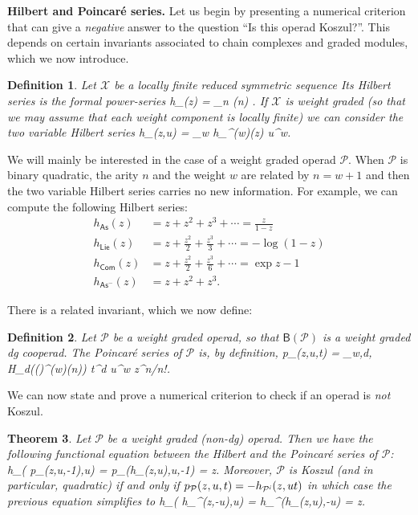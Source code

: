 \documentclass[fleqn, a4paper, twoside]{article}
\makeatletter
\newcommand{\eantishriek}{\emph{\text{\raisebox{\depth}{\textexclamdown}}}}
\newcommand{\0}{\langle 0\rangle}
\newcommand{\XX}{\mathcal{X}}
\newcommand{\B}[1]{\mathsf{B}(#1)}
\let\[\@undefined
\DeclareRobustCommand{\[}{\begin{equation}}%
\let\]\@undefined
\DeclareRobustCommand{\]}{\end{equation}}%
\theoremstyle{mytheorem}
\newtheorem{theorem}{Theorem}[section]
\theoremstyle{introthm}
\theoremstyle{mydefinition}
\newtheorem{definition}[theorem]{Definition}
\theoremstyle{mydefinition2}
\theoremstyle{plain} %
\newcommand{\As}{\mathsf{As}}
\newcommand{\Com}{\mathsf{Com}}
\newcommand{\Lie}{\mathsf{Lie}}
\newcommand{\?}{\,?\,}
\newcommand{\PP}{{\mathcal{P}}}
\theoremstyle{mytheorem}
\theoremstyle{plain} %
\makeatother
\begin{document}
\textbf{Hilbert and Poincar\'e series.} Let us begin
by presenting a numerical criterion that can give a \emph{negative}
answer to the question ``Is this operad Koszul?''. This
depends on certain invariants associated to chain complexes
and graded modules, which we now introduce.

\begin{definition}
Let $\XX$ be a locally finite reduced symmetric sequence
Its \emph{Hilbert series} is the formal power-series
\[
h_\XX(z) = \sum_{n} \dim \XX(n) .
\]
If $\XX$ is weight graded (so that we may assume that each
weight component is locally finite) we can consider the two
variable Hilbert series
 \[
h_\XX(z,u) = \sum_{w} h_{\XX^{(w)}}(z) u^w.
\]
\end{definition}

We will mainly be interested in the case of a weight graded operad $\PP$.
When $\PP$ is binary quadratic, the arity $n$ and the weight $w$ are related
by $n = w+1$ and then the two variable Hilbert series carries no new information.
For example, we can compute the following Hilbert series:
\begin{align*}
h_{\As}(z) &=  z + z^2 + z^3 + \cdots = \frac{z}{1-z} \\
h_{\Lie}(z) &=  z + \frac {z^2}2 + \frac{z^3} 3 + \cdots =-\log(1-z) \\
h_{\Com}(z) &=  z + \frac {z^2}2 + \frac{z^3} 6  + \cdots = \exp z -1 \\
h_{\As^-}(z) &=  z +  {z^2} + z^3.
\end{align*}


There is a related invariant, which we now define:
\begin{definition} Let $\PP$ be a weight graded operad, so that
$\B{\PP}$ is a weight graded dg cooperad. The Poincar\'e series
of $\PP$ is, by definition,
\[
p_{\PP}(z,u,t) = \sum_{w,d,} \dim H_d(\B{\PP}^{(w)}(n)) t^d u^w z^n/n!.
\]
\end{definition}

We can now state and prove a numerical criterion to check if an
operad is \emph{not} Koszul.

\begin{theorem}
Let $\PP$ be a weight graded (non-dg) operad. Then we have the following
functional equation between the Hilbert and the Poincar\'e series of $\PP$:
\[
h_\PP( p_\PP(z,u,-1),u) = p_\PP(h_\PP(z,u),u,-1) = z. \]
Moreover, $\PP$ is Koszul (and in particular, quadratic) if and only
if $p_\PP(z,u,t) = -h_{\PP^\eantishriek}(z,ut)$ in which case the previous
equation simplifies to
\[
h_\PP( h_{\PP^\eantishriek}(z,-u),u) = h_{\PP^\eantishriek}(h_\PP(z,u),-u) = z. 
\]
\end{theorem}
\end{document}
